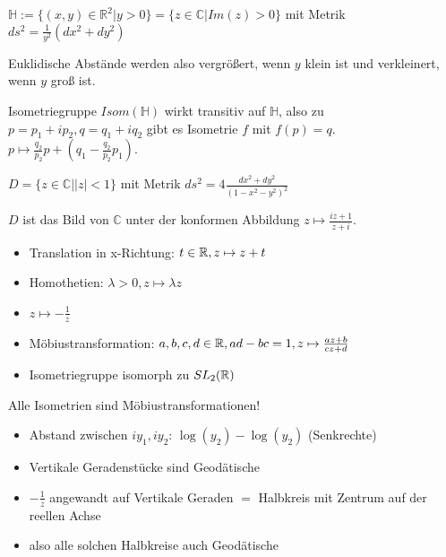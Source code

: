 \begin{defi}[Halbebene]
    $\mathbb{H}:= \{(x,y) \in \mathbb{R}^2 | y > 0\} = \{z \in \mathbb{C} | Im(z)>0\}$
    mit Metrik $ds^2 = \frac{1}{y^2}(dx^2+dy^2)$
\end{defi}

\begin{bem}
    Euklidische Abstände werden also 
    vergrößert,  wenn $y$ klein ist und 
    verkleinert, wenn $y$ groß ist.
\end{bem}

\begin{bem}
    Isometriegruppe $Isom(\mathbb{H})$ wirkt transitiv auf $\mathbb{H}$,
    also zu $p=p_1+ip_2,q=q_1+iq_2$ gibt es Isometrie $f$ mit $f(p)=q$.
    $p \mapsto \frac{q_2}{p_2}p + (q_1 - \frac{q_2}{p_2}p_1)$.
\end{bem}

\begin{defi}
    $ D = \{z \in \mathbb{C} | |z|<1\}$ 
    mit Metrik $ds^2 = 4\frac{dx^2+dy^2}{(1-x^2-y^2)^2}$
\end{defi}

\begin{bem}
    $D$ ist das Bild von $\mathbb{C}$ unter der konformen Abbildung 
    $z\mapsto\frac{iz+1}{z+i}$.
\end{bem}

\begin{bem}
    \begin{itemize}
        \item Translation in x-Richtung: $t \in \mathbb R, z \mapsto z+t$
        \item Homothetien: $\lambda > 0, z \mapsto \lambda z$
        \item $z \mapsto -\frac{1}{z}$
        \item Möbiustransformation: $a,b,c,d \in \mathbb R, ad-bc=1,z \mapsto \frac{az+b}{cz+d}$
        \item Isometriegruppe isomorph zu $SL_2(\mathbb R)$
    \end{itemize}
    Alle Isometrien sind Möbiustransformationen!
\end{bem}

\begin{bem}[Geodätische]
    \begin{itemize}
        \item Abstand zwischen $iy_1, iy_2$: $\log(y_2)-\log(y_2)$ (Senkrechte)
        \item Vertikale Geradenstücke sind Geodätische
        \item $-\frac{1}{z}$ angewandt auf Vertikale Geraden $=$ Halbkreis mit Zentrum auf der reellen Achse
        \item also alle solchen Halbkreise auch Geodätische
    \end{itemize}
\end{bem}

